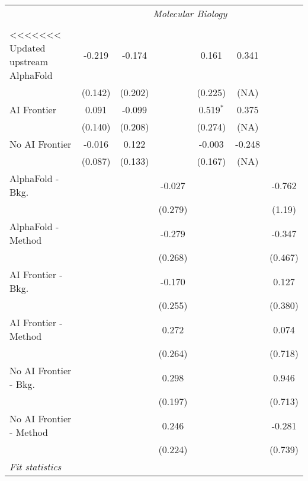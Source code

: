 \begin{tabular}{lcccccc}
 & \multicolumn{6}{c}{\textit{Molecular Biology}} \\ \\
<<<<<<< Updated upstream
   AlphaFold               & -0.219  & -0.174  &         & 0.161       & 0.341  &   \\   
                           & (0.142) & (0.202) &         & (0.225)     & (NA)   &   \\   
   AI Frontier             & 0.091   & -0.099  &         & 0.519$^{*}$ & 0.375  &   \\   
                           & (0.140) & (0.208) &         & (0.274)     & (NA)   &   \\   
   No AI Frontier          & -0.016  & 0.122   &         & -0.003      & -0.248 &   \\   
                           & (0.087) & (0.133) &         & (0.167)     & (NA)   &   \\   
   AlphaFold - Bkg.        &         &         & -0.027  &             &        & -0.762\\   
                           &         &         & (0.279) &             &        & (1.19)\\   
   AlphaFold - Method      &         &         & -0.279  &             &        & -0.347\\   
                           &         &         & (0.268) &             &        & (0.467)\\   
   AI Frontier - Bkg.      &         &         & -0.170  &             &        & 0.127\\   
                           &         &         & (0.255) &             &        & (0.380)\\   
   AI Frontier - Method    &         &         & 0.272   &             &        & 0.074\\   
                           &         &         & (0.264) &             &        & (0.718)\\   
   No AI Frontier - Bkg.   &         &         & 0.298   &             &        & 0.946\\   
                           &         &         & (0.197) &             &        & (0.713)\\   
   No AI Frontier - Method &         &         & 0.246   &             &        & -0.281\\   
                           &         &         & (0.224) &             &        & (0.739)\\   
   \midrule
   \emph{Fit statistics}\\

\end{tabular}
